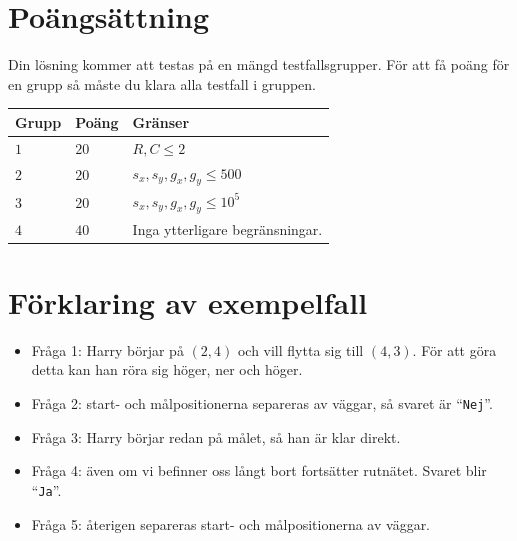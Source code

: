 \section*{Poängsättning}
Din lösning kommer att testas på en mängd testfallsgrupper.
För att få poäng för en grupp så måste du klara alla testfall i gruppen.

\noindent
\begin{tabular}{| l | l | p{12cm} |}
  \hline
  \textbf{Grupp} & \textbf{Poäng} & \textbf{Gränser} \\ \hline
  $1$    & $20$  & $R, C \leq 2$ \\ \hline
  $2$    & $20$  & $s_x, s_y, g_x, g_y \leq 500$ \\ \hline
  $3$    & $20$  & $s_x, s_y, g_x, g_y \leq 10^5$ \\ \hline
  $4$    & $40$  & Inga ytterligare begränsningar. \\ \hline
\end{tabular}

\section*{Förklaring av exempelfall}
\begin{itemize}
  \item Fråga 1: Harry börjar på $(2,4)$ och vill flytta sig till $(4,3)$.  
  För att göra detta kan han röra sig höger, ner och höger.
  \item Fråga 2: start- och målpositionerna separeras av väggar, så svaret är ``\texttt{Nej}''.
  \item Fråga 3: Harry börjar redan på målet, så han är klar direkt.
  \item Fråga 4: även om vi befinner oss långt bort fortsätter rutnätet. Svaret blir ``\texttt{Ja}''.
  \item Fråga 5: återigen separeras start- och målpositionerna av väggar.
\end{itemize}

